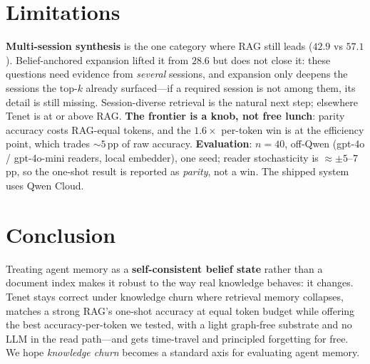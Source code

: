 \documentclass[11pt]{article}
\begin{document}
\section{Limitations}
\textbf{Multi-session synthesis} is the one category where RAG still leads ($42.9$ vs $57.1$).
Belief-anchored expansion lifted it from $28.6$ but does not close it: these questions need
evidence from \emph{several} sessions, and expansion only deepens the sessions the top-$k$
already surfaced---if a required session is not among them, its detail is still missing.
Session-diverse retrieval is the natural next step; elsewhere Tenet is at or above RAG.
\textbf{The frontier is a knob, not free lunch}: parity accuracy costs RAG-equal tokens, and
the $1.6\times$ per-token win is at the efficiency point, which trades ${\sim}5$\,pp of raw
accuracy. \textbf{Evaluation}: $n{=}40$, off-Qwen (gpt-4o / gpt-4o-mini readers, local
embedder), one seed; reader stochasticity is ${\approx}{\pm}5$--$7$\,pp, so the one-shot result
is reported as \emph{parity}, not a win. The shipped system uses Qwen Cloud.

\section{Conclusion}
Treating agent memory as a \textbf{self-consistent belief state} rather than a document index
makes it robust to the way real knowledge behaves: it changes. Tenet stays correct under
knowledge churn where retrieval memory collapses, matches a strong RAG's one-shot accuracy at
equal token budget while offering the best accuracy-per-token we tested, with a light
graph-free substrate and no LLM in the read path---and gets time-travel and principled
forgetting for free. We hope \emph{knowledge churn} becomes a standard axis for
evaluating agent memory.
\end{document}
